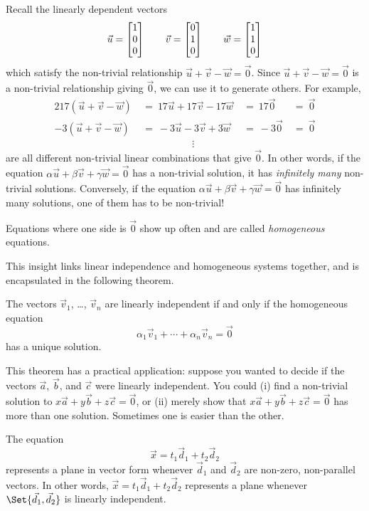 Recall the linearly dependent vectors 
\[
	\vec u=\mat{1\\0\\0}\qquad \vec v=\mat{0\\1\\0}\qquad \vec w=\mat{1\\1\\0}
\]
which satisfy the non-trivial relationship $\vec u+\vec v-\vec w=\vec 0$. Since $\vec u+\vec v-\vec w=\vec 0$
is a non-trivial relationship giving $\vec 0$, we can use it to generate others. For example,
\begin{alignat*}{2}
	17(\vec u+\vec v-\vec w)\ &=\ 17\vec u+17\vec v-17\vec w\ &=\ 17\vec 0\ &=\ \vec 0\\
	-3(\vec u+\vec v-\vec w)\ &=\ -3\vec u-3\vec v+3\vec w\ &=\ -3\vec 0\ &=\ \vec 0\\
	&\hspace{5em}\vdots&&
\end{alignat*}
are all different non-trivial linear combinations that give $\vec 0$. In other words, if 
the equation $\alpha\vec u+\beta \vec v+\gamma \vec w=\vec 0$ has a non-trivial solution,
it has \emph{infinitely many} non-trivial solutions. Conversely, if  the equation
$\alpha\vec u+\beta \vec v+\gamma \vec w=\vec 0$ has infinitely many solutions, one of them
has to be non-trivial!

Equations where one side is $\vec 0$ show up often and are called \emph{homogeneous} equations.

This insight links linear independence and homogeneous systems together, and is encapsulated
in the following theorem.

\begin{theorem}
	The vectors $\vec v_1$, \ldots, $\vec v_n$ are linearly independent if and only if
	the homogeneous equation
	\[
		\alpha_1\vec v_1+\cdots +\alpha_n\vec v_n=\vec 0
	\]
	has a unique solution.
\end{theorem}

This theorem has a practical application: suppose you wanted to decide if the vectors $\vec a$, $\vec b$, and
$\vec c$ were linearly independent. You could (i) find a non-trivial solution to $x\vec a+y\vec b+z\vec c=\vec 0$, 
or (ii) merely show that $x\vec a+y\vec b+z\vec c=\vec 0$ has more than one solution. Sometimes one is easier than
the other.


The equation
\[
	\vec x=t_1\vec d_1+t_2\vec d_2
\]
represents a plane in vector form whenever $\vec d_1$ and $\vec d_2$ are non-zero, non-parallel vectors.
In other words, 
	$\vec x=t_1\vec d_1+t_2\vec d_2$
	represents a plane whenever $\Set{\vec d_1,\vec d_2}$ is linearly independent.


